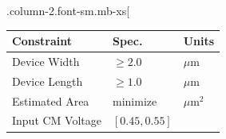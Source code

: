 \documentclass[
]{article}
\begin{document}
.column-2.font-sm.mb-xs{[}

\begin{longtable}[]{@{}lll@{}}
\toprule
\begin{minipage}[b]{0.35\columnwidth}\raggedright
Constraint\strut
\end{minipage} & \begin{minipage}[b]{0.28\columnwidth}\raggedright
Spec.\strut
\end{minipage} & \begin{minipage}[b]{0.28\columnwidth}\raggedright
Units\strut
\end{minipage}\tabularnewline
\midrule
\endhead
\begin{minipage}[t]{0.35\columnwidth}\raggedright
Device Width\strut
\end{minipage} & \begin{minipage}[t]{0.28\columnwidth}\raggedright
\(\geq 2.0\)\strut
\end{minipage} & \begin{minipage}[t]{0.28\columnwidth}\raggedright
\(\mu\)m\strut
\end{minipage}\tabularnewline
\begin{minipage}[t]{0.35\columnwidth}\raggedright
Device Length\strut
\end{minipage} & \begin{minipage}[t]{0.28\columnwidth}\raggedright
\(\geq 1.0\)\strut
\end{minipage} & \begin{minipage}[t]{0.28\columnwidth}\raggedright
\(\mu\)m\strut
\end{minipage}\tabularnewline
\begin{minipage}[t]{0.35\columnwidth}\raggedright
Estimated Area\strut
\end{minipage} & \begin{minipage}[t]{0.28\columnwidth}\raggedright
minimize\strut
\end{minipage} & \begin{minipage}[t]{0.28\columnwidth}\raggedright
\(\mu\)m\(^2\)\strut
\end{minipage}\tabularnewline
\begin{minipage}[t]{0.35\columnwidth}\raggedright
Input CM Voltage\strut
\end{minipage} & \begin{minipage}[t]{0.28\columnwidth}\raggedright
\([0.45,0.55]\)\strut
\end{minipage} & \begin{minipage}[t]{0.28\columnwidth}\raggedright

\end{minipage}
\end{longtable}
\end{document}
